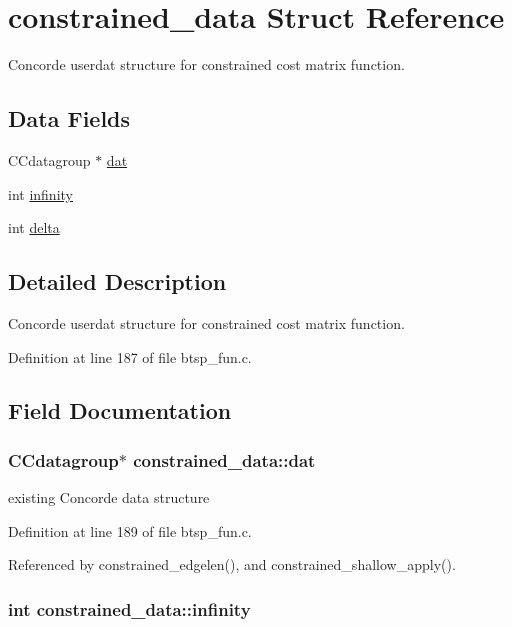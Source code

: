 \hypertarget{structconstrained__data}{
\section{constrained\_\-data Struct Reference}
\label{structconstrained__data}
}
Concorde userdat structure for constrained cost matrix function.  


\subsection*{Data Fields}
\begin{CompactItemize}
\item 
CCdatagroup $\ast$ \hyperlink{structconstrained__data_517c13548dbd3645f85fc59b9aaa5f5a}{dat}
\item 
int \hyperlink{structconstrained__data_113c60c7266cd5834238e7dd325899fa}{infinity}
\item 
int \hyperlink{structconstrained__data_1f33c1fc7b0fdcb2771167f061ff4724}{delta}
\end{CompactItemize}


\subsection{Detailed Description}
Concorde userdat structure for constrained cost matrix function. 

Definition at line 187 of file btsp\_\-fun.c.

\subsection{Field Documentation}
\hypertarget{structconstrained__data_517c13548dbd3645f85fc59b9aaa5f5a}{
\subsubsection{\setlength{\rightskip}{0pt plus 5cm}CCdatagroup$\ast$ {\bf constrained\_\-data::dat}}}
\label{structconstrained__data_517c13548dbd3645f85fc59b9aaa5f5a}


existing Concorde data structure 

Definition at line 189 of file btsp\_\-fun.c.

Referenced by constrained\_\-edgelen(), and constrained\_\-shallow\_\-apply().\hypertarget{structconstrained__data_113c60c7266cd5834238e7dd325899fa}{
\subsubsection{\setlength{\rightskip}{0pt plus 5cm}int {\bf constrained\_\-data::infinity}}}
\label{structconstrained__data_113c60c7266cd5834238e7dd325899fa}



